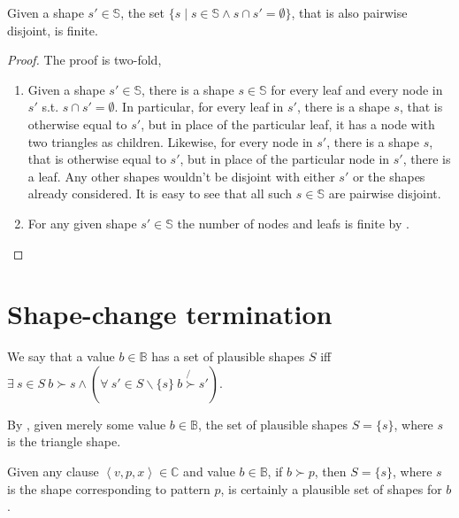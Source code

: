 \begin{theorem}\label{lemma:extend-finite-converse} Given a shape
$s'\in\mathbb{S}$, the set $\{s \mid s\in\mathbb{S} \wedge s\cap
s'=\emptyset\}$, that is also pairwise disjoint, is finite.\end{theorem}

\begin{proof} The proof is two-fold,

\begin{enumerate}

\item Given a shape $s'\in\mathbb{S}$, there is a shape $s\in\mathbb{S}$ for
every leaf and every node in $s'$ s.t. $s\cap s'=\emptyset$. In particular, for
every leaf in $s'$, there is a shape $s$, that is otherwise equal to $s'$, but
in place of the particular leaf, it has a node with two triangles as children.
Likewise, for every node in $s'$, there is a shape $s$, that is otherwise equal
to $s'$, but in place of the particular node in $s'$, there is a leaf. Any
other shapes wouldn't be disjoint with either $s'$ or the shapes already
considered. It is easy to see that all such $s\in\mathbb{S}$ are pairwise
disjoint.

\item For any given shape $s'\in\mathbb{S}$ the number of nodes and leafs is
finite by .\end{enumerate}\end{proof} 

\section{Shape-change termination}

\begin{definition} We say that a value $b\in\mathbb{B}$ has a set of plausible
shapes $S$ iff\\ $\exists\ s\in S\ b\succ s \wedge \left( \forall\ s'\in
S\backslash\{s\}\ b \not{\succ} s'  \right)$.\end{definition}

\begin{corollary} By , given merely some value
$b\in\mathbb{B}$, the set of plausible shapes $S=\{s\}$, where $s$ is the
triangle shape.\end{corollary}

\begin{corollary} Given any clause $\left\langle v,p,x
\right\rangle\in\mathbb{C}$ and value $b\in\mathbb{B}$, if $b\succ p$, then
$S=\{s\}$, where $s$ is the shape corresponding to pattern $p$, is certainly a
plausible set of shapes for $b$.\end{corollary}

